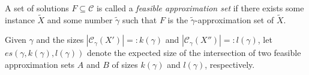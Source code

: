 \begin{definition} \label{def:feasible_as}
  A set of solutions $F\subseteq\mathcal{C}$ is called a
  \emph{feasible approximation set} if there exists some instance $\tilde X$ and
  some number $\tilde \gamma$ such that $F$ is the $\tilde \gamma$-approximation
  set of $\tilde X$.
\end{definition}

\begin{definition} \label{def:intersection_due_to_gamma}
  Given $\gamma$ and the sizes $|{\mathcal{C}_\gamma}(X')| =: k(\gamma)$ and
  $|{\mathcal{C}_\gamma}(X'')| =: l(\gamma)$, let
  $es(\gamma,k(\gamma),l(\gamma))$ denote the expected size of the intersection
  of two feasible approximation sets $A$ and $B$ of sizes $k(\gamma)$ and
  $l(\gamma)$, respectively.
\end{definition}
  
